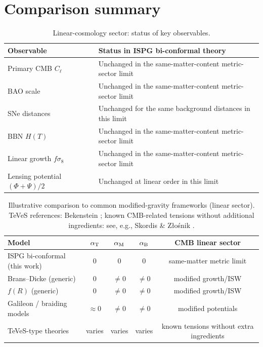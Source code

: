 \documentclass[11pt]{article}
\newcommand{\aB}{\alpha_{\rm B}}
\newcommand{\aM}{\alpha_{\rm M}}
\newcommand{\aT}{\alpha_{\rm T}}
\begin{document}
\section{Comparison summary}
\label{sec:tables}

\begin{table}[ht]
\centering
\caption{Linear-cosmology sector: status of key observables.}
\begin{tabular}{@{}lp{}@{}}
\toprule
Observable & Status in ISPG bi-conformal theory \\ \midrule
Primary CMB $C_\ell$ & Unchanged in the same-matter-content metric-sector limit \\
BAO scale & Unchanged in the same-matter-content metric-sector limit \\
SNe distances & Unchanged for the same background distances in this limit \\
BBN $H(T)$ & Unchanged in the same-matter-content metric-sector limit \\
Linear growth $f\sigma_8$ & Unchanged in the same-matter-content metric-sector limit \\
Lensing potential $(\Phi+\Psi)/2$ & Unchanged at linear order in this limit \\
\bottomrule
\end{tabular}
\end{table}

\begin{table}[ht]
\centering
\caption{Illustrative comparison to common modified-gravity frameworks (linear sector).
TeVeS references: Bekenstein \cite{Bekenstein2004}; known CMB-related tensions without
additional ingredients: see, e.g., Skordis \& Z\l{}o\'snik \cite{SkordisZlosnik2021}.}
\begin{tabular}{@{}lcccc@{}}
\toprule
Model & $\aT$ & $\aM$ & $\aB$ & CMB linear sector \\ \midrule
ISPG bi-conformal (this work) & $0$ & $0$ & $0$ & same-matter metric limit \\
Brans--Dicke (generic) & $0$ & $\neq 0$ & $\neq 0$ & modified growth/ISW \\
$f(R)$ (generic) & $0$ & $\neq 0$ & $\neq 0$ & modified growth/ISW \\
Galileon / braiding models & $\approx 0$ & $\neq 0$ & $\neq 0$ & modified potentials \\
TeVeS-type theories & varies & varies & varies & known tensions without extra ingredients \\
\bottomrule
\end{tabular}
\end{table}
\end{document}
